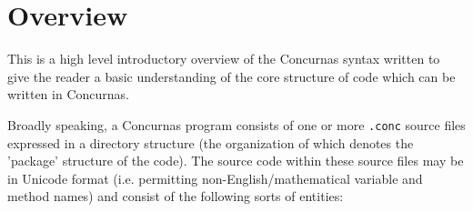 \documentclass[conc-doc]{subfiles}
\begin{document}
	
\chapter{Overview}

This is a high level introductory overview of the Concurnas syntax written to give the reader a basic understanding of the core structure of code which can be written in Concurnas.

Broadly speaking, a Concurnas program consists of one or more \lstinline{.conc} source files expressed in a directory structure (the organization of which denotes the 'package' structure of the code). The source code within these source files may be in Unicode format (i.e. permitting non-English/mathematical variable and method names) and consist of the following sorts of entities:
\end{document}
